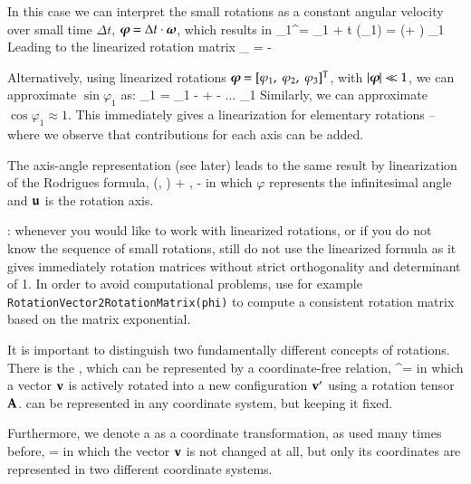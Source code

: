 In this case we can interpret the small rotations as a constant angular velocity over small time $\Delta t$, $\mbox{\boldmath $\varphi$ \unboldmath}\!\! = \Delta t \cdot \mbox{\boldmath $\omega$ \unboldmath}\!\!$, which results in
\be
  \rv_1^\prime= \rv_1 + \Delta t \cdot (\tomega \times \rv_1) = (\Im + \tilde \tvarphi) \rv_1
\ee
Leading to the linearized rotation matrix
\be
  \Rot_ = \Im - \tilde \tvarphi
\ee

Alternatively, using linearized rotations $\mbox{\boldmath $\varphi$ \unboldmath}\!\! = [\varphi_1,\;\varphi_2,\;\varphi_3]^\mathrm{T}$, with $|\mbox{\boldmath $\varphi$ \unboldmath}\!\!| \ll 1$, we can approximate $\sin \varphi_1$ as:
\be
  \sin \varphi_1 = \varphi_1 -  +  - ... \approx \varphi_1
\ee
Similarly, we can approximate $\cos \varphi_1 \approx 1$. This immediately gives a linearization for elementary rotations -- where we observe that contributions for each axis can be added.

The axis-angle representation (see later) leads to the same result by linearization of the Rodrigues formula,
\be
  \Rot(\uv, \varphi) \approx \Im + \tilde \uv \varphi, \quad \Rot\tp \approx \Im - \tilde \uv \varphi
\ee
in which $\varphi$ represents the infinitesimal angle and $\mathbf{u}$ is the rotation axis.

: whenever you would like to work with linearized rotations, or if you do not know the sequence of small rotations, still do not use the linearized formula as it gives immediately rotation matrices without strict orthogonality and determinant of 1. In order to avoid computational problems, use for example \texttt{RotationVector2RotationMatrix(phi)} to compute a consistent rotation matrix based on the matrix exponential.


%
It is important to distinguish two fundamentally different concepts of rotations.
There is the , which can be represented by a coordinate-free relation,
\be \label{eq:theory:rotations:active}
  \vv^\prime = \Rot \vv
\ee
in which a vector $\mathbf{v}$ is actively rotated into a new configuration $\mathbf{v}^\prime$ using a rotation tensor $\mathbf{A}$.
 can be represented in any coordinate system, but keeping it fixed.

Furthermore, we denote a  as a coordinate transformation, as used many times before,
\be
   =  
\ee
in which the vector $\mathbf{v}$ is not changed at all, but only its coordinates are represented in two different coordinate systems.

